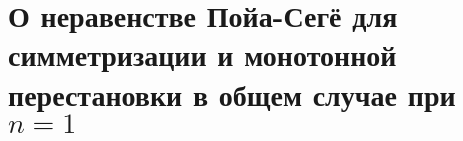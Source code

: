 \chapter{О неравенстве Пойа-Сегё для симметризации и монотонной перестановки в общем случае при $n = 1$}
\label{chapt2}






